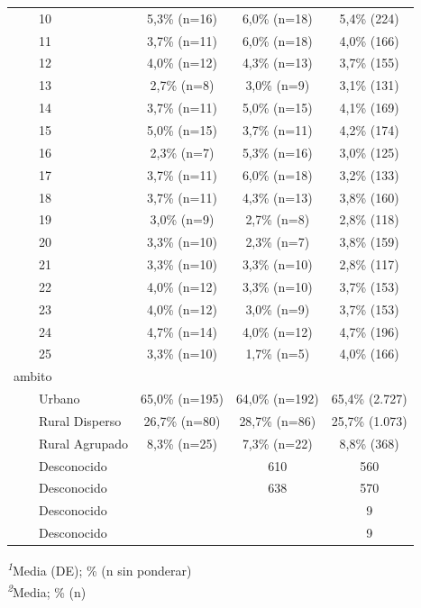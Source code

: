 \documentclass[
  spanish,
  a4paper,
]{scrreprt}
\begin{document}
\begin{table}
{\begin{tabular*}{\linewidth}{@{\extracolsep{\fill}}lccc}
    10 & 5,3\% (n=16) & 6,0\% (n=18) & 5,4\% (224) \\ 
    11 & 3,7\% (n=11) & 6,0\% (n=18) & 4,0\% (166) \\ 
    12 & 4,0\% (n=12) & 4,3\% (n=13) & 3,7\% (155) \\ 
    13 & 2,7\% (n=8) & 3,0\% (n=9) & 3,1\% (131) \\ 
    14 & 3,7\% (n=11) & 5,0\% (n=15) & 4,1\% (169) \\ 
    15 & 5,0\% (n=15) & 3,7\% (n=11) & 4,2\% (174) \\ 
    16 & 2,3\% (n=7) & 5,3\% (n=16) & 3,0\% (125) \\ 
    17 & 3,7\% (n=11) & 6,0\% (n=18) & 3,2\% (133) \\ 
    18 & 3,7\% (n=11) & 4,3\% (n=13) & 3,8\% (160) \\ 
    19 & 3,0\% (n=9) & 2,7\% (n=8) & 2,8\% (118) \\ 
    20 & 3,3\% (n=10) & 2,3\% (n=7) & 3,8\% (159) \\ 
    21 & 3,3\% (n=10) & 3,3\% (n=10) & 2,8\% (117) \\ 
    22 & 4,0\% (n=12) & 3,3\% (n=10) & 3,7\% (153) \\ 
    23 & 4,0\% (n=12) & 3,0\% (n=9) & 3,7\% (153) \\ 
    24 & 4,7\% (n=14) & 4,0\% (n=12) & 4,7\% (196) \\ 
    25 & 3,3\% (n=10) & 1,7\% (n=5) & 4,0\% (166) \\ 
ambito &  &  &  \\ 
    Urbano & 65,0\% (n=195) & 64,0\% (n=192) & 65,4\% (2.727) \\ 
    Rural Disperso & 26,7\% (n=80) & 28,7\% (n=86) & 25,7\% (1.073) \\ 
    Rural Agrupado & 8,3\% (n=25) & 7,3\% (n=22) & 8,8\% (368) \\ 
    Desconocido &  & 610 & 560 \\ 
    Desconocido &  & 638 & 570 \\ 
    Desconocido &  &  & 9 \\ 
    Desconocido &  &  & 9 \\ 
\bottomrule
\end{tabular*}
\begin{minipage}{\linewidth}
\textsuperscript{\textit{1}}Media (DE); \% (n sin ponderar)\\
\textsuperscript{\textit{2}}Media; \% (n)\\
\end{minipage}

}

\end{table}%
\end{document}
